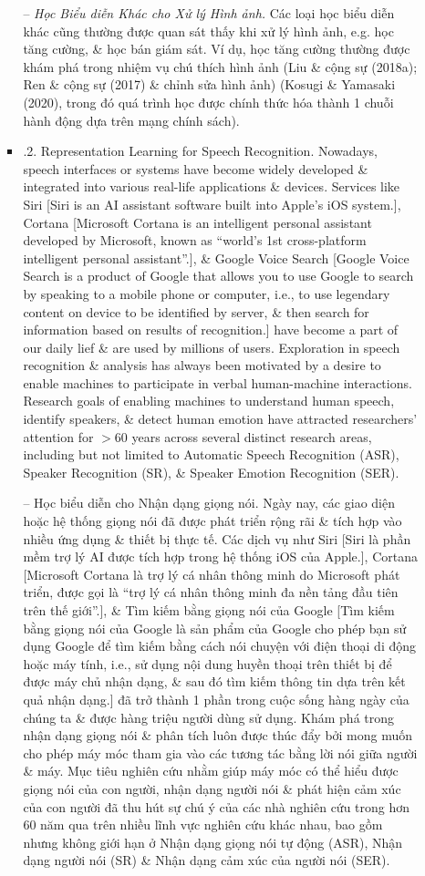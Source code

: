 \documentclass{article}
\begin{document}
\begin{itemize}
\begin{itemize}
\begin{itemize}
            -- {\it Học Biểu diễn Khác cho Xử lý Hình ảnh.} Các loại học biểu diễn khác cũng thường được quan sát thấy khi xử lý hình ảnh, e.g. học tăng cường, \& học bán giám sát. Ví dụ, học tăng cường thường được khám phá trong nhiệm vụ chú thích hình ảnh (Liu \& cộng sự (2018a); Ren \& cộng sự (2017) \& chỉnh sửa hình ảnh) (Kosugi \& Yamasaki (2020), trong đó quá trình học được chính thức hóa thành 1 chuỗi hành động dựa trên mạng chính sách).
            \item {.2. Representation Learning for Speech Recognition.} Nowadays, speech interfaces or systems have become widely developed \& integrated into various real-life applications \& devices. Services like Siri [Siri is an AI assistant software built into Apple's iOS system.], Cortana [Microsoft Cortana is an intelligent personal assistant developed by Microsoft, known as ``world's 1st cross-platform intelligent personal assistant''.], \& Google Voice Search [Google Voice Search is a product of Google that allows you to use Google to search by speaking to a mobile phone or computer, i.e., to use legendary content on device to be identified by server, \& then search for information based on results of recognition.] have become a part of our daily lief \& are used by millions of users. Exploration in speech recognition \& analysis has always been motivated by a desire to enable machines to participate in verbal human-machine interactions. Research goals of enabling machines to understand human speech, identify speakers, \& detect human emotion have attracted researchers' attention for $> 60$ years across several distinct research areas, including but not limited to Automatic Speech Recognition (ASR), Speaker Recognition (SR), \& Speaker Emotion Recognition (SER).

            -- {\sf Học biểu diễn cho Nhận dạng giọng nói.} Ngày nay, các giao diện hoặc hệ thống giọng nói đã được phát triển rộng rãi \& tích hợp vào nhiều ứng dụng \& thiết bị thực tế. Các dịch vụ như Siri [Siri là phần mềm trợ lý AI được tích hợp trong hệ thống iOS của Apple.], Cortana [Microsoft Cortana là trợ lý cá nhân thông minh do Microsoft phát triển, được gọi là ``trợ lý cá nhân thông minh đa nền tảng đầu tiên trên thế giới''.], \& Tìm kiếm bằng giọng nói của Google [Tìm kiếm bằng giọng nói của Google là sản phẩm của Google cho phép bạn sử dụng Google để tìm kiếm bằng cách nói chuyện với điện thoại di động hoặc máy tính, i.e., sử dụng nội dung huyền thoại trên thiết bị để được máy chủ nhận dạng, \& sau đó tìm kiếm thông tin dựa trên kết quả nhận dạng.] đã trở thành 1 phần trong cuộc sống hàng ngày của chúng ta \& được hàng triệu người dùng sử dụng. Khám phá trong nhận dạng giọng nói \& phân tích luôn được thúc đẩy bởi mong muốn cho phép máy móc tham gia vào các tương tác bằng lời nói giữa người \& máy. Mục tiêu nghiên cứu nhằm giúp máy móc có thể hiểu được giọng nói của con người, nhận dạng người nói \& phát hiện cảm xúc của con người đã thu hút sự chú ý của các nhà nghiên cứu trong hơn 60 năm qua trên nhiều lĩnh vực nghiên cứu khác nhau, bao gồm nhưng không giới hạn ở Nhận dạng giọng nói tự động (ASR), Nhận dạng người nói (SR) \& Nhận dạng cảm xúc của người nói (SER).


\end{itemize}
\end{itemize}
\end{itemize}
\end{document}
